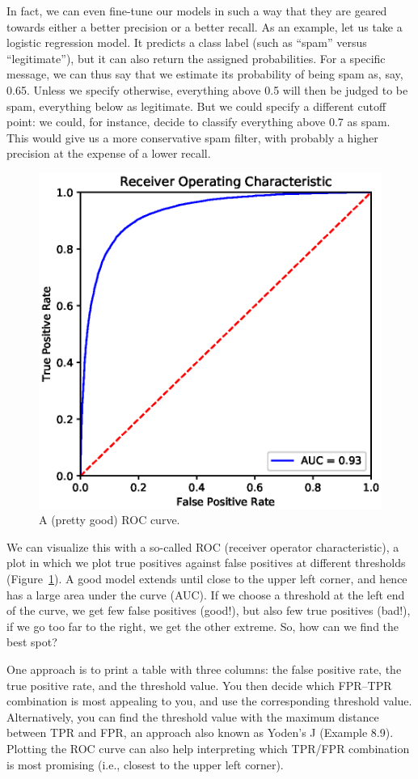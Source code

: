 In fact, we can even fine-tune our models in such a way that they are
geared towards either a better precision or a better recall.
As an example, let us take a logistic regression model. It predicts a
class label (such as ``spam'' versus ``legitimate''), but it can also
return the assigned probabilities. For a specific message, we can thus
say that we estimate its probability of being spam as, say, 0.65.
Unless we specify otherwise, everything above 0.5 will then be judged
to be spam, everything below as legitimate. But we could specify a
different cutoff point: we could, for instance, decide to classify
 everything above 0.7 as spam. This would give us a more
conservative spam filter, with probably a higher precision at the
expense of a lower recall.

\begin{figure}
\centering
\includegraphics[width=0.4\linewidth]{figures/ch09_roccurve.eps}
\caption{A (pretty good) ROC curve.}
\label{fig:roccurve}
\end{figure}

We can visualize this with a so-called ROC (receiver operator
characteristic), a plot in which we plot
true positives against false positives at different thresholds (Figure~\ref{fig:roccurve}).
A good model extends until close to the upper left corner, and hence has
a large area under the curve (AUC). If we choose a threshold at the
left end of the curve, we get few false positives (good!), but also
few true positives (bad!), if we go too far to the right, we get
the other extreme. So, how can we find the best spot?

One approach is to print a table with three columns: the false
positive rate, the true positive rate, and the threshold value. You
then decide which FPR--TPR combination is most appealing to you, and
use the corresponding threshold value. Alternatively, you can find the threshold value
with the maximum distance between TPR and FPR, an approach also known as Yoden's J (Example 8.9). 
Plotting the ROC curve can also help interpreting which 
TPR/FPR combination is most promising (i.e., closest to the upper left corner).

